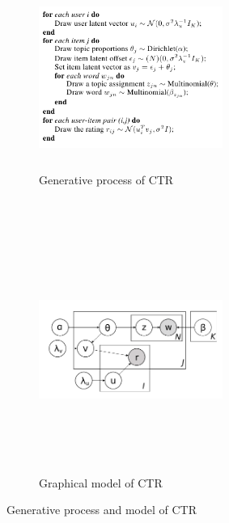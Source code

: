 \documentclass{article} %
\begin{document}
\begin{figure}[h]
	\centering
	\begin{subfigure}[b]{0.45\textwidth}
	\includegraphics[width=6cm,height=6cm,keepaspectratio]{ctr-gen-process.png}
	\caption{Generative process of CTR}
	\label{fig:ctr-gen}
	\end{subfigure}
	~
	\begin{subfigure}[b]{0.45\textwidth}
	\includegraphics[width=6cm,height=8cm,keepaspectratio]{ctr-model.png}
	\caption{Graphical model of CTR}
	\label{fig:ctr-model}
	\end{subfigure}
\caption{Generative process and model of CTR}
\label{fig:ctr}
\end{figure} 
\end{document}
